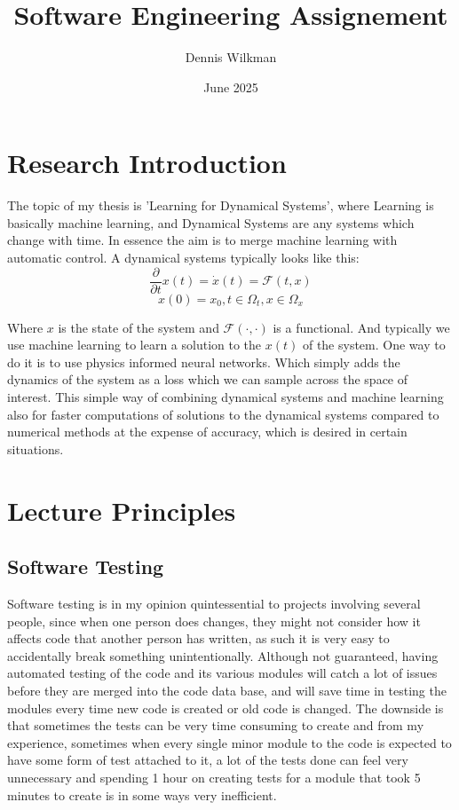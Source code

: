 \documentclass{article}
\title{Software Engineering Assignement}
\author{Dennis Wilkman}
\date{June 2025}
\begin{document}
\maketitle
\section{Research Introduction}
The topic of my thesis is 'Learning for Dynamical Systems', where Learning is basically machine learning, and Dynamical Systems are any systems which change with time. In essence the aim is to merge machine learning with automatic control. A dynamical systems typically looks like this:
\[
    \frac{\partial}{\partial t} x(t) = \dot x(t) = \mathcal{F}(t,x)  
\]
\[
    x(0) = x_0, t\in \Omega_t, x \in \Omega_x
\]


Where $x$ is the state of the system and $\mathcal{F(\cdot, \cdot)}$ is a functional. And typically we use machine learning to learn a solution to the $x(t)$ of the system. One way to do it is to use physics informed neural networks. Which simply adds the dynamics of the system as a loss which we can sample across the space of interest. This simple way of combining dynamical systems and machine learning also for faster computations of solutions to the dynamical systems compared to numerical methods at the expense of accuracy, which is desired in certain situations.

\section{Lecture Principles}
\subsection{Software Testing}
Software testing is in my opinion quintessential to projects involving several people, since when one person does changes, they might not consider how it affects code that another person has written, as such it is very easy to accidentally break something unintentionally. Although not guaranteed, having automated testing of the code and its various modules will catch a lot of issues before they are merged into the code data base, and will save time in testing the modules every time new code is created or old code is changed. The downside is that sometimes the tests can be very time consuming to create and from my experience, sometimes when every single minor module to the code is expected to have some form of test attached to it, a lot of the tests done can feel very unnecessary and spending 1 hour on creating tests for a module that took 5 minutes to create is in some ways very inefficient. 
\end{document}

